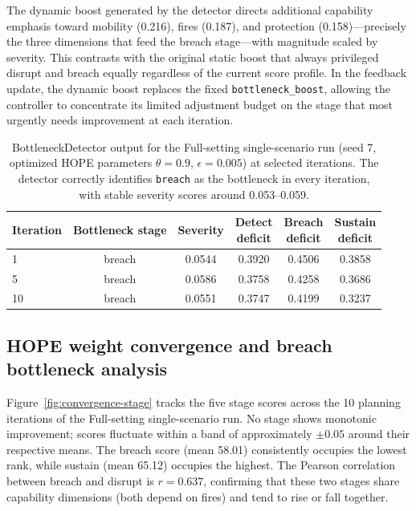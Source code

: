 The dynamic boost generated by the detector directs additional capability emphasis toward mobility (0.216), fires (0.187), and protection (0.158)---precisely the three dimensions that feed the breach stage---with magnitude scaled by severity. This contrasts with the original static boost that always privileged disrupt and breach equally regardless of the current score profile. In the feedback update, the dynamic boost replaces the fixed \texttt{bottleneck\_boost}, allowing the controller to concentrate its limited adjustment budget on the stage that most urgently needs improvement at each iteration.

\begin{table}[ht]
\centering
\caption{BottleneckDetector output for the Full-setting single-scenario run (seed 7, optimized HOPE parameters $\theta=0.9$, $\epsilon=0.005$) at selected iterations. The detector correctly identifies \texttt{breach} as the bottleneck in every iteration, with stable severity scores around 0.053--0.059.}
\label{tab:bottleneck-diagnostic}
\small
\setlength{\tabcolsep}{5pt}
\begin{tabular}{lccccc}
\toprule
Iteration & Bottleneck stage & Severity & \shortstack{Detect\\deficit} & \shortstack{Breach\\deficit} & \shortstack{Sustain\\deficit} \\
\midrule
1 & breach & 0.0544 & 0.3920 & 0.4506 & 0.3858 \\
5 & breach & 0.0586 & 0.3758 & 0.4258 & 0.3686 \\
10 & breach & 0.0551 & 0.3747 & 0.4199 & 0.3237 \\
\bottomrule
\end{tabular}
\end{table}

\subsection{HOPE weight convergence and breach bottleneck analysis}

Figure~\ref{fig:convergence-stage} tracks the five stage scores across the 10 planning iterations of the Full-setting single-scenario run. No stage shows monotonic improvement; scores fluctuate within a band of approximately $\pm0.05$ around their respective means. The breach score (mean 58.01) consistently occupies the lowest rank, while sustain (mean 65.12) occupies the highest. The Pearson correlation between breach and disrupt is $r=0.637$, confirming that these two stages share capability dimensions (both depend on fires) and tend to rise or fall together.

